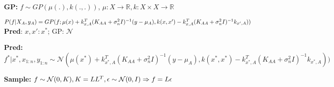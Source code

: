 \textbf{GP:} $f \sim GP(\mu(.), k(.,.))$, $\mu: X \rightarrow \mathbb{R}, k: X\times X \rightarrow \mathbb{R}$\\
\begin{comment}
	\textbf{Definition:} A set of (infinitely) many random variables, using a finite subset indexed by a set X.\\
	\textbf{Definition 2:} A set of variables are a GP, if and only if any marginalized set of random variables is a multivariate Gaussian.\\
	We need to make sure that we are consistent in this infinite set, that's why we have a mean function and covariance function, both encode assumptions about the prior. By having each function a Gaussian, we can combine the means/variances of the single random variables.\\
\end{comment}

$P(f|X_A,y_A) = GP(f; 
\mu(x) + k_{x,A}^T(K_{AA} + \sigma_n^2 I)^{-1}(y - \mu_A),\\
k(x,x') - k_{x,A}^T(K_{AA} + \sigma_n^2 I)^{-1} k_{x',A}))$ \textbf{Pred}: $x,x': x^*$; GP: $\mathcal{N}$

\textbf{Pred:}
$f^* | x^*, x_{1:n}, y_{1:n} \sim \mathcal{N}(\mu(x^*) + k_{x^*,A}^T(K_{AA} + \sigma_n^2 I)^{-1}(y - \mu_A),
k(x^*,x^*) - k_{x^*,A}^T(K_{AA} + \sigma_n^2 I)^{-1} k_{x^*,A}))$


\begin{comment}
	\textbf{Cost:} Size of $K_{AA}$ is $|X_A|\times |X_A|$, cost of inversion $O(|X_A|^3)$. 
	$k_{x',X_A}$ is a $|X_A|$ vector, evaluating x' against all elements from $X_A$.\\
	\textbf{Speed-up:} Kernels with distance notion can just use nearby points, treat the rest as independent.\\
\end{comment}

\textbf{Sample:} $f \sim \mathcal{N}(0,K), K=LL^T, \epsilon \sim \mathcal{N}(0,I) \Rightarrow f = L\epsilon$\\
\begin{comment}
	We don't sample f directly, we sample from a marginal distribution that is finite and Gaussian.\\
\end{comment}

